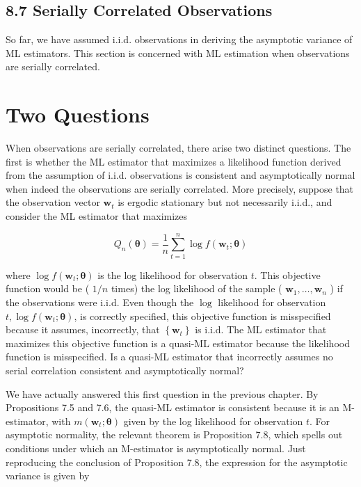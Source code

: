 \documentclass[10pt]{article}
\begin{document}
\subsection*{8.7 Serially Correlated Observations}
So far, we have assumed i.i.d. observations in deriving the asymptotic variance of ML estimators. This section is concerned with ML estimation when observations are serially correlated.

\section*{Two Questions}
When observations are serially correlated, there arise two distinct questions. The first is whether the ML estimator that maximizes a likelihood function derived from the assumption of i.i.d. observations is consistent and asymptotically normal when indeed the observations are serially correlated. More precisely, suppose that the observation vector $\mathbf{w}_{t}$ is ergodic stationary but not necessarily i.i.d., and consider the ML estimator that maximizes


\begin{equation*}
Q_{n}(\boldsymbol{\theta})=\frac{1}{n} \sum_{t=1}^{n} \log f\left(\mathbf{w}_{t} ; \boldsymbol{\theta}\right) \tag{8.7.1}
\end{equation*}


where $\log f\left(\mathbf{w}_{t} ; \boldsymbol{\theta}\right)$ is the log likelihood for observation $t$. This objective function would be ( $1 / n$ times) the log likelihood of the sample ( $\mathbf{w}_{1}, \ldots, \mathbf{w}_{n}$ ) if the observations were i.i.d. Even though the $\log$ likelihood for observation $t, \log f\left(\mathbf{w}_{t} ; \boldsymbol{\theta}\right)$, is correctly specified, this objective function is misspecified because it assumes, incorrectly, that $\left\{\mathbf{w}_{t}\right\}$ is i.i.d. The ML estimator that maximizes this objective function is a quasi-ML estimator because the likelihood function is misspecified. Is a quasi-ML estimator that incorrectly assumes no serial correlation consistent and asymptotically normal?

We have actually answered this first question in the previous chapter. By Propositions 7.5 and 7.6, the quasi-ML estimator is consistent because it is an M-estimator, with $m\left(\mathbf{w}_{t} ; \boldsymbol{\theta}\right)$ given by the log likelihood for observation $t$. For asymptotic normality, the relevant theorem is Proposition 7.8, which spells out conditions under which an M-estimator is asymptotically normal. Just reproducing the conclusion of Proposition 7.8, the expression for the asymptotic variance is given by
\end{document}
